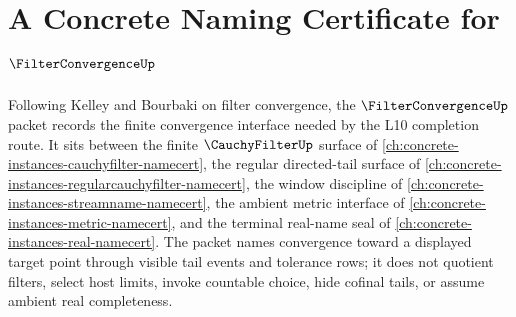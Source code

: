 \chapter{A Concrete Naming Certificate for $\FilterConvergenceUp$}
\label{ch:concrete-instances-filter-convergence-namecert}

Following Kelley and Bourbaki on filter convergence, the $\FilterConvergenceUp$ packet records the finite convergence interface needed by the L10 completion route. It sits between the finite $\CauchyFilterUp$ surface of \autoref{ch:concrete-instances-cauchyfilter-namecert}, the regular directed-tail surface of \autoref{ch:concrete-instances-regularcauchyfilter-namecert}, the window discipline of \autoref{ch:concrete-instances-streamname-namecert}, the ambient metric interface of \autoref{ch:concrete-instances-metric-namecert}, and the terminal real-name seal of \autoref{ch:concrete-instances-real-namecert}. The packet names convergence toward a displayed target point through visible tail events and tolerance rows; it does not quotient filters, select host limits, invoke countable choice, hide cofinal tails, or assume ambient real completeness.

